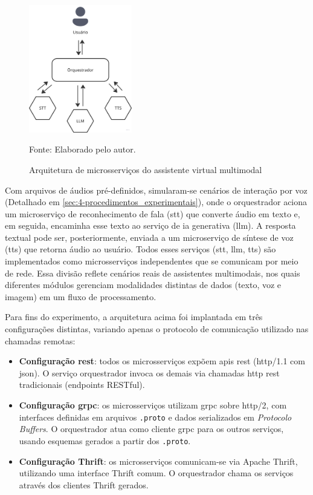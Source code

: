 \begin{figure}[H]
\caption{Arquitetura de microsserviços do assistente virtual multimodal}
\label{fig:4-arquitetura-experimentos}
\centering
\includegraphics[width=0.4\textwidth]{imagens/4-arquitetura_cenario.png}
{\par \raggedright \footnotesize Fonte: Elaborado pelo autor.}
\end{figure}

Com arquivos de áudios pré-definidos, simularam-se cenários de interação por voz (Detalhado em \ref{sec:4-procedimentos_experimentais}), onde o orquestrador aciona um microserviço de reconhecimento de fala (\acrshort{stt}) que converte áudio em texto e, em seguida, encaminha esse texto ao serviço de \gls{ia} generativa (\acrshort{llm}). A resposta textual pode ser, posteriormente, enviada a um microserviço de síntese de voz (\acrshort{tts}) que retorna áudio ao usuário. Todos esses serviços (\acrshort{stt}, \acrshort{llm}, \acrshort{tts}) são implementados como microsserviços independentes que se comunicam por meio de rede. Essa divisão reflete cenários reais de assistentes multimodais, nos quais diferentes módulos gerenciam modalidades distintas de dados (texto, voz e imagem) em um fluxo de processamento.

Para fins do experimento, a arquitetura acima foi implantada em três configurações distintas, variando apenas o protocolo de comunicação utilizado nas chamadas remotas:

\begin{itemize}
\item \textbf{Configuração \gls{rest}}: todos os microsserviços expõem \gls{api}s \gls{rest} (\acrshort{http}/1.1 com \acrshort{json}). O serviço orquestrador invoca os demais via chamadas \acrshort{http} \gls{rest} tradicionais (endpoints RESTful).
\item \textbf{Configuração \gls{grpc}}: os microsserviços utilizam \gls{grpc} sobre \acrshort{http}/2, com interfaces definidas em arquivos \texttt{.proto} e dados serializados em \textit{Protocolo Buffers}. O orquestrador atua como cliente \gls{grpc} para os outros serviços, usando esquemas gerados a partir dos \texttt{.proto}.
\item \textbf{Configuração Thrift}: os microsserviços comunicam-se via Apache Thrift, utilizando uma interface Thrift comum. O orquestrador chama os serviços através dos clientes Thrift gerados.
\end{itemize}

